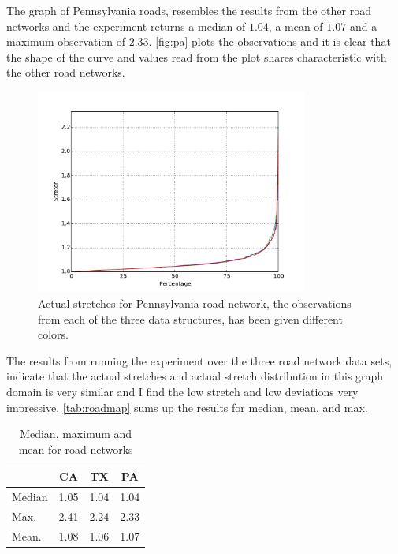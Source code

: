 The graph of Pennsylvania roads, resembles the results from the other road
networks and the experiment returns a median of $1.04$, a mean of $1.07$ and
a maximum observation of $2.33$. \autoref{fig:pa} plots the observations and
it is clear that the shape of the curve and values read from the plot shares
characteristic with the other road networks.

\begin{figure}[htbp]
    \centering
    \includegraphics[width=0.8\textwidth]{plots/roadnet_pa.pdf}
    \caption{Actual stretches for Pennsylvania road network, the observations
    from each of the three data structures, has been given different colors.}
    \label{fig:pa}
\end{figure}

The results from running the experiment over the three road network data sets,
indicate that the actual stretches and actual stretch distribution in this
graph domain is very similar and I find the low stretch and low deviations very
impressive. \autoref{tab:roadmap} sums up the results for median, mean, and max.
\begin{table}[htbp]
    \centering
    \begin{tabular}{ l | c | c | c }
        \toprule
             & CA & TX & PA \\
        \midrule
        Median & 1.05 & 1.04 & 1.04 \\
        Max. & 2.41 & 2.24 & 2.33 \\
        \midrule
        Mean. & 1.08 & 1.06 & 1.07 \\
    \end{tabular}
    \caption{Median, maximum and mean for road networks}
    \label{tab:roadmap}
\end{table}
\clearpage


